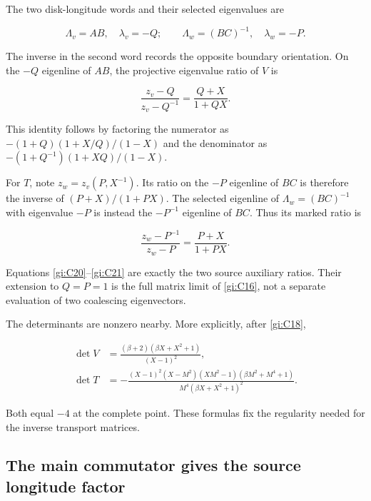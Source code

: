 The two disk-longitude words and their selected eigenvalues are

\begin{equation}\label{gi:C19}
\Lambda_v=AB,\quad \lambda_v=-Q;
 \qquad
 \Lambda_w=(BC)^{-1},\quad \lambda_w=-P.
\end{equation}

The inverse in the second word records the opposite boundary orientation. On the \(-Q\) eigenline of \(AB\), the projective eigenvalue ratio of \(V\) is

\begin{equation}\label{gi:C20}
\frac{z_v-Q}{z_v-Q^{-1}}
                         =\frac{Q+X}{1+QX}.
\end{equation}

This identity follows by factoring the numerator as
\(-(1+Q)(1+X/Q)/(1-X)\) and the denominator as
\(-(1+Q^{-1})(1+XQ)/(1-X)\).

For \(T\), note \(z_w=z_v(P,X^{-1})\). Its ratio on the \(-P\) eigenline of \(BC\) is therefore the inverse of \((P+X)/(1+PX)\). The selected eigenline of \(\Lambda_w=(BC)^{-1}\) with eigenvalue \(-P\) is instead the \(-P^{-1}\) eigenline of \(BC\). Thus its marked ratio is

\begin{equation}\label{gi:C21}
\frac{z_w-P^{-1}}{z_w-P}
                         =\frac{P+X}{1+PX}.
\end{equation}

Equations \eqref{gi:C20}--\eqref{gi:C21} are exactly the two source auxiliary ratios. Their extension to \(Q=P=1\) is the full matrix limit of \eqref{gi:C16}, not a separate evaluation of two coalescing eigenvectors.

The determinants are nonzero nearby. More explicitly, after \eqref{gi:C18},

\begin{equation}\label{gi:C22}
\begin{aligned}
 \det V&=\frac{(\beta+2)(\beta X+X^2+1)}{(X-1)^2},\\
 \det T&=
 -\frac{(X-1)^2(X-M^2)(XM^2-1)
                (\beta M^2+M^4+1)}
 {M^4(\beta X+X^2+1)^2}.
 \end{aligned}
\end{equation}

Both equal \(-4\) at the complete point. These formulas fix the regularity needed for the inverse transport matrices.

\subsection{The main commutator gives the source longitude factor}\label{gi:the-main-commutator-gives-the-source-longitude-factor}

